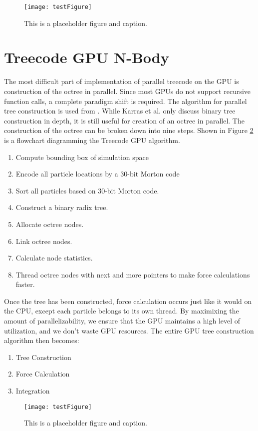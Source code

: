 \documentclass{thesis}
\begin{document}
\begin{figure}[h]
    \caption{This is a placeholder figure and caption.}
    \label{fig:IntegrationInterleaving}
    \centering
    \texttt{[image: testFigure]}
\end{figure}
\section{Treecode GPU N-Body}
The most difficult part of implementation of parallel treecode on the GPU is construction of the octree in parallel. Since most GPUs do not support recursive function calls, a complete paradigm shift is required. The algorithm for parallel tree construction is used from \cite{karras:2012}. While Karras et al. only discuss binary tree construction in depth, it is still useful for creation of an octree in parallel. The construction of the octree can be broken down into nine steps. Shown in Figure \ref{fig:GPUTreecodeAlg} is a flowchart diagramming the Treecode GPU algorithm.
\begin{enumerate}
    \item Compute bounding box of simulation space
    \item Encode all particle locations by a 30-bit Morton code
    \item Sort all particles based on 30-bit Morton code.
    \item Construct a binary radix tree.
    \item Allocate octree nodes.
    \item Link octree nodes.
    \item Calculate node statistics.
    \item Thread octree nodes with next and more pointers to make force calculations faster.
\end{enumerate}
Once the tree has been constructed, force calculation occurs just like it would on the CPU, except each particle belongs to its own thread. By maximixing the amount of parallelizability, we ensure that the GPU maintains a high level of utilization, and we don't waste GPU resources. The entire GPU tree construction algorithm then becomes:
\begin{enumerate}
    \item Tree Construction
    \item Force Calculation
    \item Integration
\end{enumerate}
\begin{figure}[h]
    \caption{This is a placeholder figure and caption.}
    \label{fig:GPUTreecodeAlg}
    \centering
    \texttt{[image: testFigure]}
\end{figure}
\end{document}
